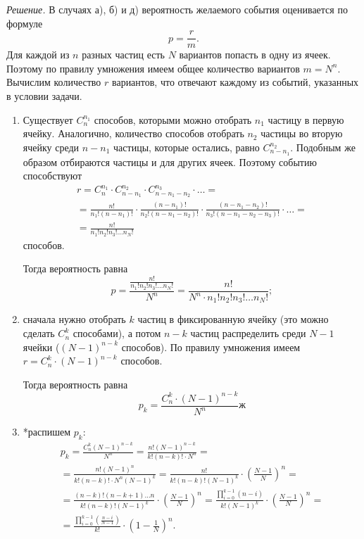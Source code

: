 \textit{Решение.} В случаях а), б) и д) вероятность желаемого события оценивается по формуле
$$p =
\frac{r}{m}.$$
Для каждой из $n$ разных частиц есть $N$ вариантов попасть в одну из ячеек.
Поэтому по правилу умножения имеем общее количество вариантов $m = N^n$.
Вычислим количество $r$ вариантов, что отвечают каждому из событий, указанных в условии задачи.

\begin{enumerate}[label=\alph*)]
\item Существует $C_n^{n_1}$ способов, которыми можно отобрать $n_1$ частицу в первую ячейку.
Аналогично, количество способов отобрать $n_2$ частицы во вторую ячейку среди $n - n_1$ частицы, которые остались, равно $C_{n-n_1}^{n_2}$.
Подобным же образом отбираются частицы и для других ячеек.
Поэтому событию способствуют
\begin{equation*}
\begin{split}
r =
C_n^{n_1} \cdot C_{n-n_1}^{n_2} \cdot C_{n - n_1 - n_2}^{n_3} \cdot \dotsc = \\
= \frac{n!}{n_1! \left( n-n_1 \right)!}
\cdot \frac{ \left( n-n_1 \right)!}{n_2! \left( n - n_1 - n_2 \right)!}
\cdot \frac{ \left( n - n_1 - n_2 \right)!}{n_3! \left( n - n_1 - n_2 - n_3 \right)!} \cdot \dotsc = \\
= \frac{n!}{n_1! n_2! n_3! \dotsc n_N!}
\end{split}
\end{equation*}
способов.

Тогда вероятность равна
$$p =
\frac{\frac{n!}{n_1! n_2! n_3! \dotsc n_N!}}{N^n} =
\frac{n!}{N^n \cdot n_1! n_2! n_3! \dotsc n_N!};$$

\item сначала нужно отобрать $k$ частиц в фиксированную ячейку
(это можно сделать $C_n^k$ способами),
а потом $n - k$ частиц распределить среди $N - 1$ ячейки
($ \left( N - 1\right)^{n-k}$ способов).
По правилу умножения имеем $r = C_n^k \cdot \left( N-1 \right)^{n-k}$ способов.

Тогда вероятность равна
$$p_k =
\frac{C_n^k \cdot \left( N-1 \right)^{n-k}}{N^n}ж$$

\item *распишем $p_k$:
\begin{equation*}
\begin{split}
p_k =
\frac{C_n^k \left( N-1 \right)^{n-k}}{N^n} =
\frac{n! \left( N-1 \right)^{n-k}}{k! \left( n-k \right)! \cdot N^n} = \\
= \frac{n! \left( N-1 \right)^n}{k! \left( n-k \right)! \cdot N^n \left( N-1 \right)^k} =
\frac{n!}{k! \left( n-k \right)! \left( N-1 \right)^k} \cdot \left( \frac{N-1}{N} \right)^n = \\
= \frac{ \left( n-k \right)! \left( n-k+1 \right) \dotsc n}{k! \left( n-k \right)! \left( N-1 \right)^k} \cdot \left(\frac{N-1}{N} \right)^n =
\frac{ \prod \limits_{i=0}^{k-1} \left( n-i \right) }{k! \left( N-1 \right)^k} \cdot \left( \frac{N-1}{N} \right)^n = \\
= \frac{ \prod \limits_{i=0}^{k-1} \left( \frac{n-i}{N-1} \right)}{k!} \cdot \left( 1 - \frac{1}{N} \right)^n.
\end{split}
\end{equation*}


\end{enumerate}
